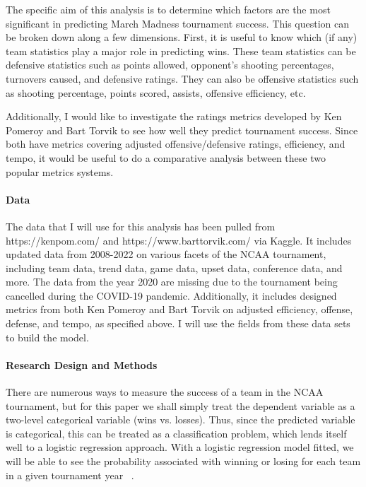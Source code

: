 \documentclass[12pt]{article}
\begin{document}
The specific aim of this analysis is to determine which factors are the most 
significant in predicting March Madness tournament success.  This question can 
be broken down along a few dimensions.  First, it is useful to know which (if any) 
team statistics play a major role in predicting wins.  These team statistics can 
be defensive statistics such as points allowed, opponent's shooting percentages, 
turnovers caused, and defensive ratings.  They can also be offensive statistics 
such as shooting percentage, points scored, assists, offensive efficiency, etc.  

Additionally, I would like to investigate the ratings metrics developed by Ken 
Pomeroy and Bart Torvik to see how well they predict tournament success.  Since 
both have metrics covering adjusted offensive/defensive ratings, efficiency, and 
tempo, it would be useful to do a comparative analysis between these two popular 
metrics systems.  

\paragraph{Data}

The data that I will use for this analysis has been pulled from https://kenpom.com/ 
and https://www.barttorvik.com/ via Kaggle.  It includes updated data from 2008-2022 
on various facets of the NCAA tournament, including team data, trend data, game data, 
upset data, conference data, and more.  The data from the year 2020 are missing due 
to the tournament being cancelled during the COVID-19 pandemic.  Additionally, it 
includes designed metrics from both Ken Pomeroy and Bart Torvik on adjusted efficiency, 
offense, defense, and tempo, as specified above.  I will use the fields from these 
data sets to build the model.  

\paragraph{Research Design and Methods}

There are numerous ways to measure the success of a team in the NCAA tournament, but 
for this paper we shall simply treat the dependent variable as a two-level categorical 
variable (wins vs. losses).  Thus, since the predicted variable is categorical, this 
can be treated as a classification problem, which lends itself well to a logistic 
regression approach.  With a logistic regression model fitted, we will be able to see 
the probability associated with winning or losing for each team in a given tournament 
year ~\citep{fonseca2018march}. 
\end{document}
